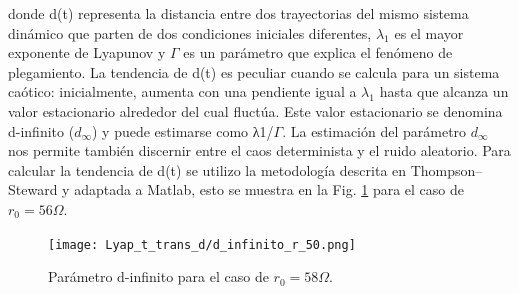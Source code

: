 \documentclass{rbf}
\begin{document}
donde d(t) representa la distancia entre dos trayectorias del mismo sistema dinámico que parten de dos condiciones iniciales diferentes, $\lambda_1$ es el mayor exponente de Lyapunov y $\Gamma$ es un parámetro que explica el fenómeno de plegamiento. La tendencia de d(t) es peculiar cuando se calcula para un sistema caótico: inicialmente, aumenta con una pendiente igual a $\lambda_1$ hasta que alcanza un valor estacionario alrededor del cual fluctúa. Este valor estacionario se denomina d-infinito ($d_∞$) y puede estimarse como λ1/$\Gamma$. La estimación del parámetro $d_∞$ nos permite también discernir entre el caos determinista y el ruido aleatorio. Para calcular la tendencia de d(t) se utilizo la metodología descrita en Thompson–Steward y adaptada a Matlab, esto se muestra en la Fig. \ref{fig:d infinito} para el caso de $r_0=56\Omega$.

\begin{figure}
    \centering
    \texttt{[image: Lyap\_t\_trans\_d/d\_infinito\_r\_50.png]}
    \caption{Parámetro d-infinito para el caso de $r_0 = 58 {\Omega}$.}
    \label{fig:d infinito}
\end{figure}
\end{document}
